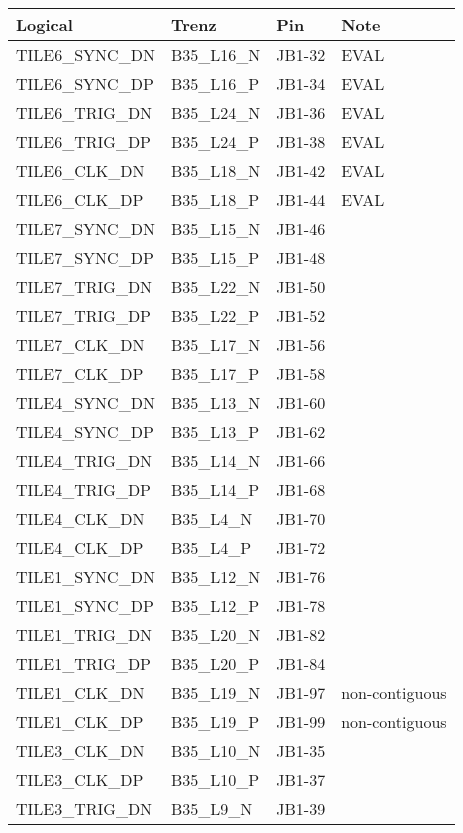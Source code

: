 \documentclass[12pt]{article}
\begin{document}
\newpage
\begin{tabular}{llll}
\hline
Logical & Trenz & Pin & Note\\  
\hline
TILE6\_SYNC\_DN    & B35\_L16\_N   & JB1-32 & EVAL \\
TILE6\_SYNC\_DP    & B35\_L16\_P   & JB1-34 & EVAL \\
TILE6\_TRIG\_DN    & B35\_L24\_N   & JB1-36 & EVAL \\
TILE6\_TRIG\_DP    & B35\_L24\_P   & JB1-38 & EVAL \\
TILE6\_CLK\_DN     & B35\_L18\_N   & JB1-42 & EVAL \\
TILE6\_CLK\_DP     & B35\_L18\_P   & JB1-44 & EVAL \\
\hline
TILE7\_SYNC\_DN    & B35\_L15\_N   & JB1-46 & \\
TILE7\_SYNC\_DP    & B35\_L15\_P   & JB1-48 & \\
TILE7\_TRIG\_DN    & B35\_L22\_N   & JB1-50 & \\
TILE7\_TRIG\_DP    & B35\_L22\_P   & JB1-52 & \\
TILE7\_CLK\_DN     & B35\_L17\_N   & JB1-56 & \\
TILE7\_CLK\_DP     & B35\_L17\_P   & JB1-58 & \\
\hline
TILE4\_SYNC\_DN    & B35\_L13\_N   & JB1-60 & \\
TILE4\_SYNC\_DP    & B35\_L13\_P   & JB1-62 & \\
TILE4\_TRIG\_DN    & B35\_L14\_N   & JB1-66 & \\
TILE4\_TRIG\_DP    & B35\_L14\_P   & JB1-68 & \\
TILE4\_CLK\_DN     & B35\_L4\_N    & JB1-70 & \\
TILE4\_CLK\_DP     & B35\_L4\_P    & JB1-72 & \\
\hline
TILE1\_SYNC\_DN    & B35\_L12\_N   & JB1-76 & \\
TILE1\_SYNC\_DP    & B35\_L12\_P   & JB1-78 & \\
TILE1\_TRIG\_DN    & B35\_L20\_N   & JB1-82 & \\
TILE1\_TRIG\_DP    & B35\_L20\_P   & JB1-84 & \\
TILE1\_CLK\_DN     & B35\_L19\_N   & JB1-97 & non-contiguous\\
TILE1\_CLK\_DP     & B35\_L19\_P   & JB1-99 & non-contiguous\\
\hline
TILE3\_CLK\_DN      & B35\_L10\_N  & JB1-35 & \\
TILE3\_CLK\_DP      & B35\_L10\_P  & JB1-37 & \\
TILE3\_TRIG\_DN     & B35\_L9\_N   & JB1-39 & \\

\end{tabular}
\end{document}
